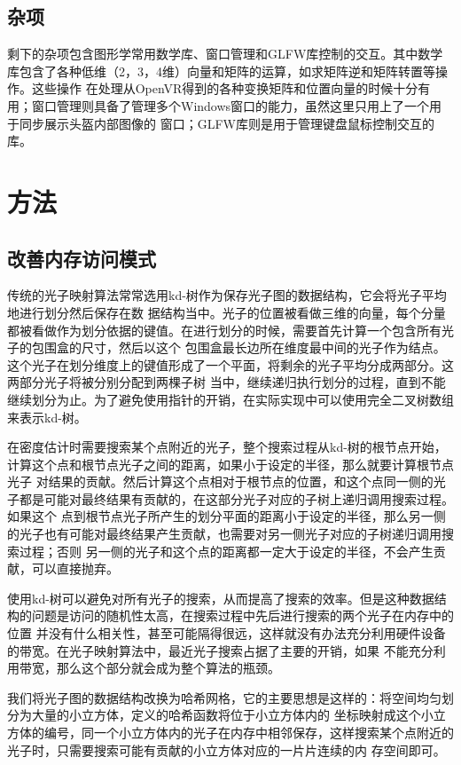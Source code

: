 \documentclass[UTF8]{ctexart}
\begin{document}
    \subsection{杂项}
        剩下的杂项包含图形学常用数学库、窗口管理和GLFW库控制的交互。其中数学库包含了各种低维（2，3，4维）向量和矩阵的运算，如求矩阵逆和矩阵转置等操作。这些操作
        在处理从OpenVR得到的各种变换矩阵和位置向量的时候十分有用；窗口管理则具备了管理多个Windows窗口的能力，虽然这里只用上了一个用于同步展示头盔内部图像的
        窗口；GLFW库则是用于管理键盘鼠标控制交互的库。
\section{方法}
    \subsection{改善内存访问模式}
        传统的光子映射算法\cite{jensen2000practical}常常选用kd-树\cite{1975Multidimensional}作为保存光子图的数据结构，它会将光子平均地进行划分然后保存在数
        据结构当中。光子的位置被看做三维的向量，每个分量都被看做作为划分依据的键值。在进行划分的时候，需要首先计算一个包含所有光子的包围盒的尺寸，然后以这个
        包围盒最长边所在维度最中间的光子作为结点。这个光子在划分维度上的键值形成了一个平面，将剩余的光子平均分成两部分。这两部分光子将被分别分配到两棵子树
        当中，继续递归执行划分的过程，直到不能继续划分为止。为了避免使用指针的开销，在实际实现中可以使用完全二叉树数组来表示kd-树。
        
        在密度估计时需要搜索某个点附近的光子，整个搜索过程从kd-树的根节点开始，计算这个点和根节点光子之间的距离，如果小于设定的半径，那么就要计算根节点光子
        对结果的贡献。然后计算这个点相对于根节点的位置，和这个点同一侧的光子都是可能对最终结果有贡献的，在这部分光子对应的子树上递归调用搜索过程。如果这个
        点到根节点光子所产生的划分平面的距离小于设定的半径，那么另一侧的光子也有可能对最终结果产生贡献，也需要对另一侧光子对应的子树递归调用搜索过程；否则
        另一侧的光子和这个点的距离都一定大于设定的半径，不会产生贡献，可以直接抛弃。
        
        使用kd-树可以避免对所有光子的搜索，从而提高了搜索的效率。但是这种数据结构的问题是访问的随机性太高，在搜索过程中先后进行搜索的两个光子在内存中的位置
        并没有什么相关性，甚至可能隔得很远，这样就没有办法充分利用硬件设备的带宽。在光子映射算法中，最近光子搜索占据了主要的开销\cite{gupte2011real}，如果
        不能充分利用带宽，那么这个部分就会成为整个算法的瓶颈。
        
        我们将光子图的数据结构改换为哈希网格\cite{fleisz2009photon}，它的主要思想是这样的：将空间均匀划分为大量的小立方体，定义的哈希函数将位于小立方体内的
        坐标映射成这个小立方体的编号，同一个小立方体内的光子在内存中相邻保存，这样搜索某个点附近的光子时，只需要搜索可能有贡献的小立方体对应的一片片连续的内
        存空间即可。
        
\end{document}
